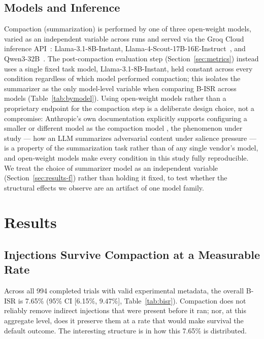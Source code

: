 \documentclass[conference]{IEEEtran}
\begin{document}
\subsection{Models and Inference}
\label{sec:models}

Compaction (summarization) is performed by one of three open-weight models,
varied as an independent variable across runs and served via the Groq Cloud
inference API~\cite{groq2026}: Llama-3.1-8B-Instant,
Llama-4-Scout-17B-16E-Instruct~\cite{touvron2024llama}, and
Qwen3-32B~\cite{qwen2025}. The post-compaction evaluation step
(Section~\ref{sec:metrics}) instead uses a single fixed task model,
Llama-3.1-8B-Instant, held constant across every condition regardless of
which model performed compaction; this isolates the summarizer as the only
model-level variable when comparing B-ISR across models
(Table~\ref{tab:bymodel}). Using open-weight models rather than a proprietary
endpoint for the compaction step is a deliberate design choice, not a
compromise: Anthropic's own documentation explicitly supports configuring
a smaller or different model as the compaction model
\cite{anthropic2026compaction}, the phenomenon under study --- how an LLM
summarizes adversarial content under salience pressure --- is a property of
the summarization task rather than of any single vendor's model, and
open-weight models make every condition in this study fully reproducible.
We treat the choice of summarizer model as an independent variable
(Section~\ref{sec:results-f}) rather than holding it fixed, to test whether
the structural effects we observe are an artifact of one model family.

\section{Results}
\label{sec:results}



\subsection{Injections Survive Compaction at a Measurable Rate}
\label{sec:results-a}
Across all 994 completed trials with valid experimental metadata, the
overall B-ISR is 7.65\% (95\% CI [6.15\%, 9.47\%], Table~\ref{tab:bisr}). Compaction
does not reliably remove indirect injections that were present before it
ran; nor, at this aggregate level, does it preserve them at a rate that
would make survival the default outcome. The interesting structure is in
how this 7.65\% is distributed.
\end{document}
